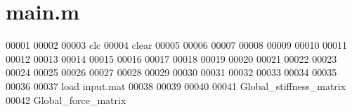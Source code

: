 \hypertarget{L02_2main_8m_source}{}\section{main.\+m}
\label{L02_2main_8m_source}

\begin{DoxyCode}
00001 %
00002 %
00003 clc
00004 clear
00005 
00006 %
00007 
00008 %
00009 %
00010 %
00011 %
00012 %
00013 %
00014 %
00015 %
00016 %
00017 
00018 %
00019 
00020 %
00021 
00022 %
00023 
00024 %
00025 
00026 %
00027 
00028 %
00029 %
00030 
00031 %
00032 %
00033 
00034 %
00035 %
00036 
00037 load input.mat
00038 
00039 %
00040 
00041 Global\_stiffness\_matrix %
00042 Global\_force\_matrix %

\end{DoxyCode}
